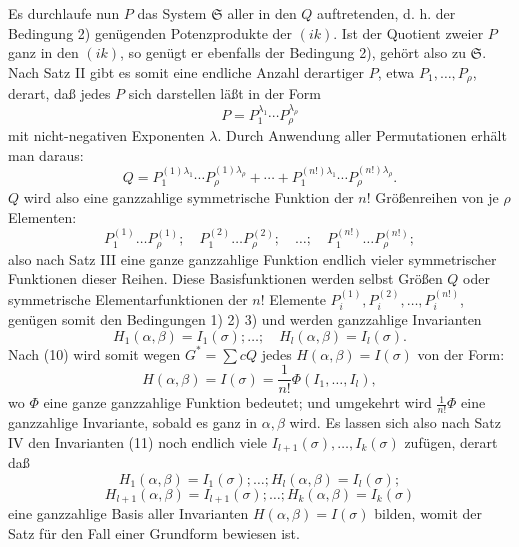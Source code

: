 \documentclass[11pt]{article}
\providecommand{\frS}{\mathfrak S}
\begin{document}
Es durchlaufe nun \(P\) das System \(\frS\) aller in den \(Q\) auftretenden, d. h. der Bedingung 2) genügenden Potenzprodukte der \((ik)\). Ist der Quotient zweier \(P\) ganz in den \((ik)\), so genügt er ebenfalls der Bedingung 2), gehört also zu \(\frS\). Nach Satz II gibt es somit eine endliche Anzahl derartiger \(P\), etwa \(P_1,\ldots,P_\rho\), derart, daß jedes \(P\) sich darstellen läßt in der Form
\[
        P=P_1^{\lambda_1}\cdots P_\rho^{\lambda_\rho}
\]
mit nicht-negativen Exponenten \(\lambda\). Durch Anwendung aller Permutationen erhält man daraus:
\[
        Q=
        P_1^{(1)\lambda_1}\cdots P_\rho^{(1)\lambda_\rho}
        +\cdots+
        P_1^{(n!)\lambda_1}\cdots P_\rho^{(n!)\lambda_\rho}.
\]
\(Q\) wird also eine ganzzahlige symmetrische Funktion der \(n!\) Größenreihen von je \(\rho\) Elementen:
\[
        P_1^{(1)}\ldots P_\rho^{(1)};
        \quad
        P_1^{(2)}\ldots P_\rho^{(2)};
        \quad \ldots;\quad
        P_1^{(n!)}\ldots P_\rho^{(n!)};
\]
also nach Satz III eine ganze ganzzahlige Funktion endlich vieler symmetrischer Funktionen dieser Reihen. Diese Basisfunktionen werden selbst Größen \(Q\) oder symmetrische Elementarfunktionen der \(n!\) Elemente \(P_i^{(1)},P_i^{(2)},\ldots,P_i^{(n!)}\), genügen somit den Bedingungen 1) 2) 3) und werden ganzzahlige Invarianten
\begin{equation}
        H_1(\alpha,\beta)=I_1(\sigma);\ldots;\quad
        H_l(\alpha,\beta)=I_l(\sigma).
\end{equation}
Nach (10) wird somit wegen \(G^*=\sum cQ\) jedes \(H(\alpha,\beta)=I(\sigma)\) von der Form:
\[
        H(\alpha,\beta)=I(\sigma)=\frac1{n!}\Phi(I_1,\ldots,I_l),
\]
wo \(\Phi\) eine ganze ganzzahlige Funktion bedeutet; und umgekehrt wird \(\frac1{n!}\Phi\) eine ganzzahlige Invariante, sobald es ganz in \(\alpha,\beta\) wird. Es lassen sich also nach Satz IV den Invarianten (11) noch endlich viele \(I_{l+1}(\sigma),\ldots,I_k(\sigma)\) zufügen, derart daß
\[
        H_1(\alpha,\beta)=I_1(\sigma);\ldots;H_l(\alpha,\beta)=I_l(\sigma);
\]
\[
        H_{l+1}(\alpha,\beta)=I_{l+1}(\sigma);\ldots;H_k(\alpha,\beta)=I_k(\sigma)
\]
eine ganzzahlige Basis aller Invarianten \(H(\alpha,\beta)=I(\sigma)\) bilden, womit der Satz für den Fall einer Grundform bewiesen ist.
\end{document}
